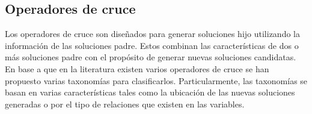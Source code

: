 \subsection{Operadores de cruce}

Los operadores de cruce son diseñados para generar soluciones hijo utilizando la información de las soluciones padre.
%
Estos combinan las características de dos o más soluciones padre con el propósito de generar nuevas soluciones candidatas.
%
En base a que en la literatura existen varios operadores de cruce se han propuesto varias taxonomías para clasificarlos.
%
Particularmente, las taxonomías se basan en varias características tales como la ubicación de las nuevas soluciones generadas o por el tipo de relaciones que existen en las variables.

